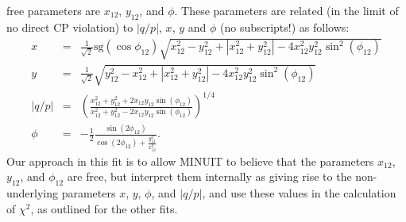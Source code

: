 free parameters are $x_{12}$, $y_{12}$, and $\phi$. These parameters are related
(in the limit of no direct CP violation) to $|q/p|$, $x$, $y$ and $\phi$ (no subscripts!) as follows:
\begin{eqnarray}
x &=& \frac{1}{\sqrt{2}}\mathrm{sg}(\cos\phi_{12})
\sqrt{x_{12}^2 - y_{12}^2 + |x_{12}^2+y_{12}^2| - 4x_{12}^2y_{12}^2\sin^2(\phi_{12})} \\
%
y &=& \frac{1}{\sqrt{2}}
\sqrt{y_{12}^2 - x_{12}^2 + |x_{12}^2+y_{12}^2| - 4x_{12}^2y_{12}^2\sin^2(\phi_{12})} \\
%
|q/p| &=& \left(\frac{x_{12}^2+y_{12}^2+2x_{12}y_{12}\sin(\phi_{12})}
{x_{12}^2+y_{12}^2-2x_{12}y_{12}\sin(\phi_{12})}\right)^{1/4}\\
%
\phi &=& -\frac{1}{2}\frac{\sin(2\phi_{12})}{\cos(2\phi_{12})+\frac{y_{12}^2}{x_{12}^2}}.
\end{eqnarray}
Our approach in this fit is to allow MINUIT to believe that the parameters $x_{12}$, $y_{12}$,
and $\phi_{12}$ are free, but interpret them internally as giving rise to the 
non-underlying parameters $x$, $y$, $\phi$, and $|q/p|$, and use these
values in the calculation of $\chi^2$, as outlined for the other fits. 

